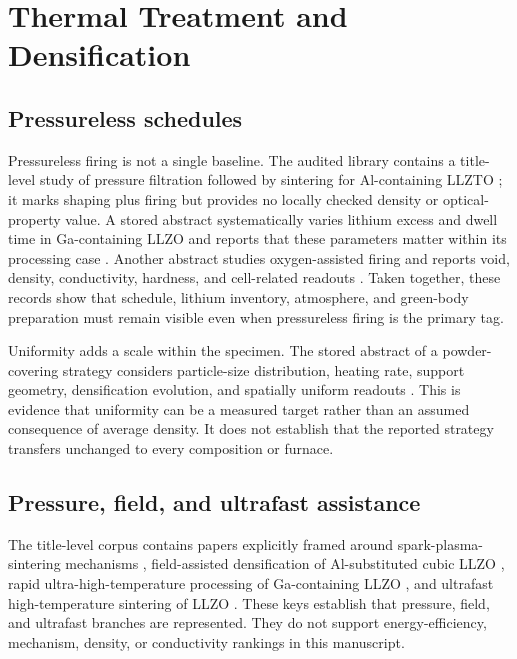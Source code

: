 \section{Thermal Treatment and Densification}

\subsection{Pressureless schedules}

Pressureless firing is not a single baseline. The audited library contains a title-level study of pressure filtration followed by sintering for Al-containing LLZTO \cite{lei2021fabrication}; it marks shaping plus firing but provides no locally checked density or optical-property value. A stored abstract systematically varies lithium excess and dwell time in Ga-containing LLZO and reports that these parameters matter within its processing case \cite{schwab2023towards}. Another abstract studies oxygen-assisted firing and reports void, density, conductivity, hardness, and cell-related readouts \cite{shen2020a}. Taken together, these records show that schedule, lithium inventory, atmosphere, and green-body preparation must remain visible even when pressureless firing is the primary tag.

Uniformity adds a scale within the specimen. The stored abstract of a powder-covering strategy considers particle-size distribution, heating rate, support geometry, densification evolution, and spatially uniform readouts \cite{guo2023uniform}. This is evidence that uniformity can be a measured target rather than an assumed consequence of average density. It does not establish that the reported strategy transfers unchanged to every composition or furnace.

\subsection{Pressure, field, and ultrafast assistance}

The title-level corpus contains papers explicitly framed around spark-plasma-sintering mechanisms \cite{yamada2016sintering}, field-assisted densification of Al-substituted cubic LLZO \cite{zhang2014field}, rapid ultra-high-temperature processing of Ga-containing LLZO \cite{tao2022preparation}, and ultrafast high-temperature sintering of LLZO \cite{ihrig2021li7la3zr2o12}. These keys establish that pressure, field, and ultrafast branches are represented. They do not support energy-efficiency, mechanism, density, or conductivity rankings in this manuscript.

